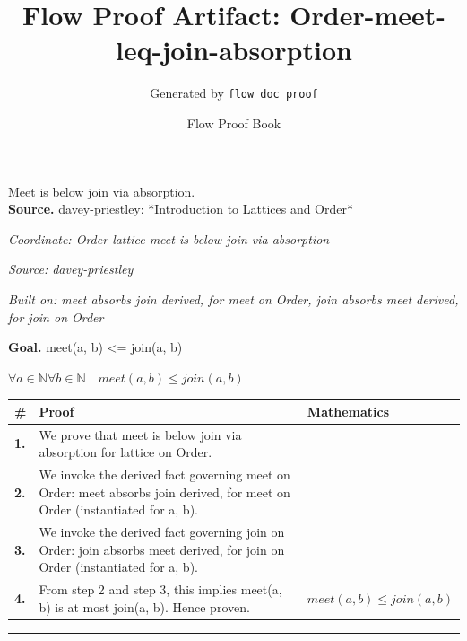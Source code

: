 \documentclass[11pt]{article}
\title{Flow Proof Artifact: Order-meet-leq-join-absorption}
\author{Generated by \texttt{flow doc proof}}
\date{Flow Proof Book}
\theoremstyle{definition}
\begin{document}
\maketitle
Meet is below join via absorption.\\[0.5em]
\textbf{Source.} davey-priestley: *Introduction to Lattices and Order*\\[0.5em]
\bigskip
{}\par
\smallskip\noindent\textit{Coordinate: Order \cdot lattice \cdot meet is below join via absorption}\par
\smallskip\noindent\textit{Source: davey-priestley}\par
\smallskip\noindent\textit{Built on: meet absorbs join derived, for meet on Order, join absorbs meet derived, for join on Order}\par
\medskip
\noindent\textbf{Goal.} meet(a, b) <= join(a, b)\par
\noindent$\displaystyle \forall a \in \mathbb{N} \forall b \in \mathbb{N}\quad meet(a, b) \le join(a, b)$\par
\medskip
\noindent
\begin{tabular}{@{} >{\raggedright\arraybackslash}p{} >{\raggedright\arraybackslash}p{} >{\raggedleft\arraybackslash}p{} @{}}
\textbf{\#} & \textbf{Proof} & \textbf{Mathematics} \\
\midrule
\textbf{1.} & We prove that meet is below join via absorption for lattice on Order. & \\[0.45em]
\textbf{2.} & We invoke the derived fact governing meet on Order: meet absorbs join derived, for meet on Order (instantiated for a, b). & \\[0.45em]
\textbf{3.} & We invoke the derived fact governing join on Order: join absorbs meet derived, for join on Order (instantiated for a, b). & \\[0.45em]
\textbf{4.} & From step 2 and step 3, this implies meet(a, b) is at most join(a, b). Hence proven. & $\displaystyle meet(a, b) \le join(a, b)$ \\[0.45em]
\bottomrule
\end{tabular}
\label{thm:Order-lattice-meet_is_below_join_via_absorption}
\par\medskip\hrule
\end{document}
